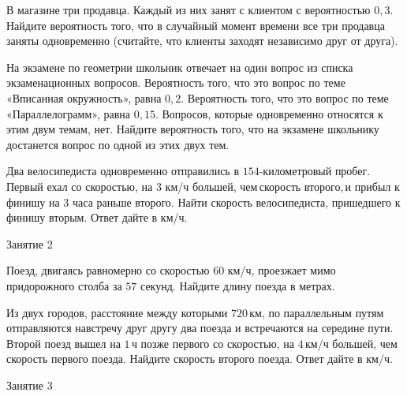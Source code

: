 \begin{class}[number=1]
\begin{listofex}
		\item В магазине три продавца. Каждый из них занят с клиентом с вероятностью \( 0,3 \). Найдите вероятность того, что в случайный момент времени все три продавца заняты одновременно (считайте, что клиенты заходят независимо друг от друга).
		\item На экзамене по геометрии школьник отвечает на один вопрос из списка экзаменационных вопросов. Вероятность того, что это вопрос по теме «Вписанная окружность», равна \( 0,2 \). Вероятность того, что это вопрос по теме «Параллелограмм», равна \( 0,15 \). Вопросов, которые одновременно относятся к этим двум темам, нет. Найдите вероятность того, что на экзамене школьнику достанется вопрос по одной из этих двух тем.
		\item Два велосипедиста одновременно отправились в \( 154 \)-километровый пробег. Первый ехал со скоростью, на \( 3 \) км/ч большей, чем скорость второго, и прибыл к финишу на \( 3 \) часа раньше второго. Найти скорость велосипедиста, пришедшего к финишу вторым. Ответ дайте в км/ч. 
		
	\end{listofex}
\end{class}

\begin{class}[number=2]
	\begin{listofex}
		\item Занятие 2
	\end{listofex}
\end{class}

\begin{homework}[number=1]
	\begin{listofex}
		\item Поезд, двигаясь равномерно со скоростью \( 60 \) км/ч, проезжает мимо придорожного столба за \( 57 \) секунд. Найдите длину поезда в метрах.
		\item Из двух городов, расстояние между которыми \( 720 \) км, по параллельным путям отправляются навстречу друг другу два поезда и встречаются на середине пути. Второй поезд вышел на \( 1 \) ч позже первого со скоростью, на \( 4 \) км/ч большей, чем скорость первого поезда. Найдите скорость второго поезда. Ответ дайте в км/ч.
	\end{listofex}
\end{homework}

\begin{class}[number=3]
	\begin{listofex}
		\item Занятие 3 
	\end{listofex}
\end{class}

